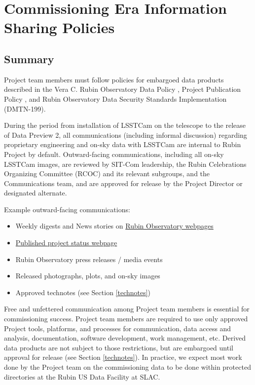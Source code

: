 \documentclass[SE,authoryear,toc,lsstdraft]{lsstdoc}
\begin{document}
\section{Commissioning Era Information Sharing Policies}
\label{policy}

\subsection{Summary}

Project team members must follow policies for embargoed data products described in the Vera C. Rubin Observatory Data Policy , Project Publication Policy , and Rubin Observatory Data Security Standards Implementation (DMTN-199).

During the period from installation of LSSTCam on the telescope to the release of Data Preview 2, all communications (including informal discussion) regarding proprietary engineering and on-sky data with LSSTCam are internal to Rubin Project by default.
Outward-facing communications, including all on-sky LSSTCam images, are reviewed by SIT-Com leadership, the Rubin Celebrations Organizing Committee (RCOC) and its relevant subgroups, and the Communications team, and are approved for release by the Project Director or designated alternate.

Example outward-facing communications:

\begin{itemize}

  \item Weekly digests and News stories on \href{https://rubinobservatory.org/}{Rubin Observatory webpages}

  \item \href{https://www.lsst.org/about/project-status}{Published project status webpage}

  \item Rubin Observatory press releases / media events

  \item Released photographs, plots, and on-sky images

  \item Approved technotes (see Section \ref{technotes})

\end{itemize}

Free and unfettered communication among Project team members is essential for commissioning success.
Project team members are required to use only approved Project tools, platforms, and processes for communication, data access and analysis, documentation, software development, work management, etc.
Derived data products are not subject to those restrictions, but are embargoed until approval for release (see Section \ref{technotes}).
In practice, we expect most work done by the Project team on the commissioning data to be done within protected directories at the Rubin US Data Facility at SLAC.
\end{document}
